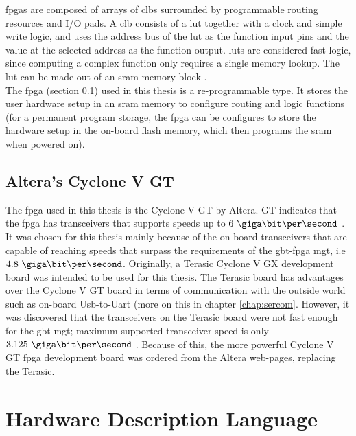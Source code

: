 \documentclass[main.tex]{subfiles}
\begin{document}
\Glspl{fpga} are composed of arrays of \glspl{clb} surrounded by programmable routing resources and I/O pads. A \gls{clb} consists of a \gls{lut} together with a clock and simple write logic, and uses the address bus of the \gls{lut} as the function input pins and the value at the selected address as the function output. \glspl{lut} are considered fast logic, since computing a complex function only requires a single memory lookup. The \gls{lut} can be made out of an \gls{sram} memory-block \cite{weste11}. \\

The \gls{fpga} (section \ref{sec:cyclone}) used in this thesis is a re-programmable type. It stores the user hardware setup in an \gls{sram} memory to configure routing and logic functions (for a permanent program storage, the \gls{fpga} can be configures to store the hardware setup in the on-board \gls{flash} memory, which then programs the \gls{sram} when powered on).


\subsection{Altera's Cyclone V GT} \label{sec:cyclone}

The \gls{fpga} used in this thesis is the Cyclone V GT by Altera. GT indicates that the \gls{fpga} has transceivers that supports speeds up to $6~\giga\bit\per\second$ \cite{altera_cvoverview15}. It was chosen for this thesis mainly because of the on-board transceivers that are capable of reaching speeds that surpass the requirements of the \gls{gbt}-\gls{fpga} \gls{mgt}, i.e $4.8~\giga\bit\per\second$. Originally, a Terasic Cyclone V GX development board was intended to be used for this thesis. The Terasic board has advantages over the Cyclone V GT board in terms of communication with the outside world such as on-board Usb-to-Uart (more on this in chapter \ref{chap:sercom}. However, it was discovered that the transceivers on the Terasic board were not fast enough for the \gls{gbt} \gls{mgt}; maximum supported transceiver speed is only $3.125~\giga\bit\per\second$ \cite{altera_cvoverview15}. Because of this, the more powerful Cyclone V GT \gls{fpga} development board was ordered from the Altera web-pages, replacing the Terasic.


\section{Hardware Description Language}
\end{document}
